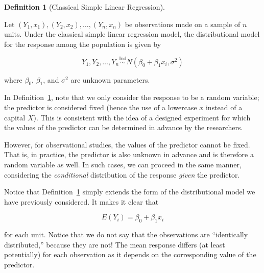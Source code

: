 \documentclass[
  letterpaper,
  DIV=11,
  numbers=noendperiod]{scrreprt}
\theoremstyle{definition}
\newtheorem{definition}{Definition}[chapter]
\theoremstyle{definition}
\theoremstyle{plain}
\theoremstyle{remark}
\begin{document}
\begin{definition}[Classical Simple Linear
Regression]\protect\hypertarget{def-classical-simple-regression}{}\label{def-classical-simple-regression}

Let
\(\left(Y_1, x_1\right), \left(Y_2, x_2\right), \dotsc, \left(Y_n, x_n\right)\)
be observations made on a sample of \(n\) units. Under the classical
simple linear regression model, the distributional model for the
response among the population is given by

\[Y_1, Y_2, \dotsc, Y_n \stackrel{\text{Ind}}{\sim} N\left(\beta_0 + \beta_1 x_i, \sigma^2\right)\]

where \(\beta_0\), \(\beta_1\), and \(\sigma^2\) are unknown parameters.

\end{definition}

\begin{tcolorbox}[enhanced jigsaw, title=\textcolor{quarto-callout-note-color}{\faInfo}\hspace{0.5em}{Note}, colbacktitle=quarto-callout-note-color!10!white, titlerule=0mm, toptitle=1mm, breakable, bottomtitle=1mm, colframe=quarto-callout-note-color-frame, opacitybacktitle=0.6, bottomrule=.15mm, arc=.35mm, toprule=.15mm, colback=white, rightrule=.15mm, coltitle=black, leftrule=.75mm, left=2mm, opacityback=0]

In Definition~\ref{def-classical-simple-regression}, note that we only
consider the response to be a random variable; the predictor is
considered fixed (hence the use of a lowercase \(x\) instead of a
capital \(X\)). This is consistent with the idea of a designed
experiment for which the values of the predictor can be determined in
advance by the researchers.

However, for observational studies, the values of the predictor cannot
be fixed. That is, in practice, the predictor is also unknown in advance
and is therefore a random variable as well. In such cases, we can
proceed in the same manner, considering the \emph{conditional}
distribution of the response \emph{given} the predictor.

\end{tcolorbox}

Notice that Definition~\ref{def-classical-simple-regression} simply
extends the form of the distributional model we have previously
considered. It makes it clear that

\[E\left(Y_i\right) = \beta_0 + \beta_1 x_i\]

for each unit. Notice that we do not say that the observations are
``identically distributed,'' because they are not! The mean response
differs (at least potentially) for each observation as it depends on the
corresponding value of the predictor.
\end{document}

